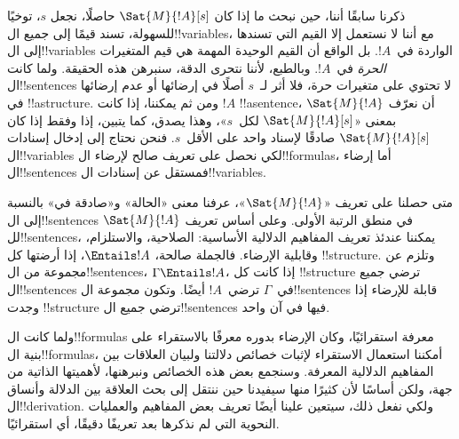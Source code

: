 \documentclass[../../../include/open-logic-section]{subfiles}
\begin{document}


ذكرنا سابقًا أننا، حين نبحث ما إذا كان $\Sat{M}{!A}[s]$ حاصلًا،
نجعل $s$، توخيًا للسهولة، تسند قيمًا إلى جميع ال!!{variable}s، مع أننا
لا نستعمل إلا القيم التي تسندها إلى ال!!{variable}s الواردة في~$!A$.
بل الواقع أن القيم الوحيدة المهمة هي قيم المتغيرات
\emph{الحرة} في~$!A$. وبالطبع، لأننا نتحرى الدقة، سنبرهن هذه الحقيقة.
ولما كانت ال!!{sentence}s لا تحتوي على متغيرات حرة، فلا أثر لـ~$s$
أصلًا في إرضائها أو عدم إرضائها في !!a{structure}. ومن ثم يمكننا، إذا
كانت $!A$ !!a{sentence}، أن نعرّف $\Sat{M}{!A}$ بمعنى
«$\Sat{M}{!A}[s]$ لكل~$s$»، وهذا يصدق، كما يتبين، إذا وفقط إذا كان
$\Sat{M}{!A}[s]$ صادقًا لإسناد واحد على الأقل~$s$. فنحن نحتاج إلى
إدخال إسنادات ال!!{variable}s لكي نحصل على تعريف صالح لإرضاء
ال!!{formula}s، أما إرضاء ال!!{sentence}s فمستقل عن إسنادات
ال!!{variable}s.

متى حصلنا على تعريف «$\Sat{M}{!A}$»، عرفنا معنى «الحالة» و«صادقة في»
بالنسبة إلى ال!!{sentence}s في منطق الرتبة الأولى. وعلى أساس تعريف
$\Sat{M}{!A}$ لل!!{sentence}s، يمكننا عندئذ تعريف المفاهيم الدلالية
الأساسية: الصلاحية، والاستلزام، وقابلية الإرضاء. فالجملة
صالحة، $\Entails !A$، إذا أرضتها كل !!{structure}. وتلزم عن
مجموعة من ال!!{sentence}s، $\Gamma \Entails !A$، إذا كانت كل
!!{structure} ترضي جميع ال!!{sentence}s في~$\Gamma$ ترضي~$!A$
أيضًا. وتكون مجموعة ال!!{sentence}s قابلة للإرضاء إذا وجدت
!!{structure} ترضي جميع ال!!{sentence}s فيها في آن واحد.

ولما كانت ال!!{formula}s معرفة استقرائيًا، وكان الإرضاء بدوره معرفًا
بالاستقراء على بنية ال!!{formula}s، أمكننا استعمال الاستقراء لإثبات
خصائص دلالتنا ولبيان العلاقات بين المفاهيم الدلالية المعرفة. وسنجمع
بعض هذه الخصائص ونبرهنها، لأهميتها الذاتية من جهة، ولكن أساسًا لأن
كثيرًا منها سيفيدنا حين ننتقل إلى بحث العلاقة بين الدلالة وأنساق
ال!!{derivation}. ولكي نفعل ذلك، سيتعين علينا أيضًا تعريف بعض المفاهيم
والعمليات النحوية التي لم نذكرها بعد تعريفًا دقيقًا، أي استقرائيًا.
\end{document}
